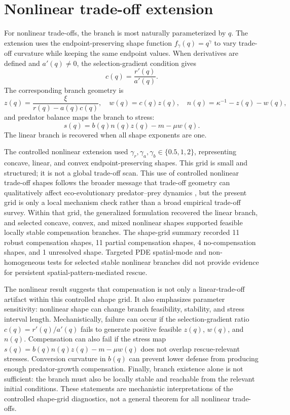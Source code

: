\documentclass[11pt]{article}
\begin{document}
\section{Nonlinear trade-off extension}

For nonlinear trade-offs, the branch is most naturally parameterized by \(q\). The extension uses the endpoint-preserving shape function \(f_\gamma(q)=q^\gamma\) to vary trade-off curvature while keeping the same endpoint values. When derivatives are defined and \(a'(q)\ne0\), the selection-gradient condition gives
\[
c(q)=\frac{r'(q)}{a'(q)}.
\]
The corresponding branch geometry is
\[
z(q)=\frac{\xi}{r(q)-a(q)c(q)},
\quad
w(q)=c(q)z(q),
\quad
n(q)=\kappa^{-1}-z(q)-w(q),
\]
and predator balance maps the branch to stress:
\[
s(q)=b(q)n(q)z(q)-m-\mu w(q).
\]
The linear branch is recovered when all shape exponents are one.

The controlled nonlinear extension used \(\gamma_r,\gamma_a,\gamma_b\in\{0.5,1,2\}\), representing concave, linear, and convex endpoint-preserving shapes. This grid is small and structured; it is not a global trade-off scan. This use of controlled nonlinear trade-off shapes follows the broader message that trade-off geometry can qualitatively affect eco-evolutionary predator--prey dynamics \citep{KasadaYamamichiYoshida2014}, but the present grid is only a local mechanism check rather than a broad empirical trade-off survey. Within that grid, the generalized formulation recovered the linear branch, and selected concave, convex, and mixed nonlinear shapes supported feasible locally stable compensation branches. The shape-grid summary recorded 11 robust compensation shapes, 11 partial compensation shapes, 4 no-compensation shapes, and 1 unresolved shape. Targeted PDE spatial-mode and non-homogeneous tests for selected stable nonlinear branches did not provide evidence for persistent spatial-pattern-mediated rescue.

The nonlinear result suggests that compensation is not only a linear-trade-off artifact within this controlled shape grid. It also emphasizes parameter sensitivity: nonlinear shape can change branch feasibility, stability, and stress interval length. Mechanistically, failure can occur if the selection-gradient ratio \(c(q)=r'(q)/a'(q)\) fails to generate positive feasible \(z(q)\), \(w(q)\), and \(n(q)\). Compensation can also fail if the stress map \(s(q)=b(q)n(q)z(q)-m-\mu w(q)\) does not overlap rescue-relevant stresses. Conversion curvature in \(b(q)\) can prevent lower defense from producing enough predator-growth compensation. Finally, branch existence alone is not sufficient: the branch must also be locally stable and reachable from the relevant initial conditions. These statements are mechanistic interpretations of the controlled shape-grid diagnostics, not a general theorem for all nonlinear trade-offs.
\end{document}
